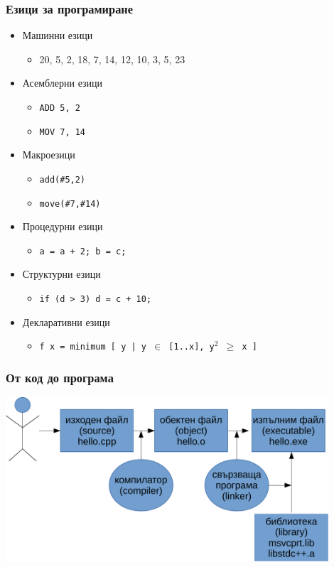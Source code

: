 \documentclass[alsotrans]{beamerswitch}
\begin{document}
\begin{frame}
  \frametitle{Езици за програмиране}
  \begin{itemize}[<+->]
  \item Машинни езици
    \begin{itemize}
    \item 20, 5, 2, 18, 7, 14, 12, 10, 3, 5, 23
    \end{itemize}
  \item Асемблерни езици
    \begin{itemize}
    \item \tt{ADD 5, 2}
    \item \tt{MOV 7, 14}
    \end{itemize}
  \item Макроезици
    \begin{itemize}
    \item \tt{add(\#5,2)}
    \item \tt{move(\#7,\#14)}
    \end{itemize}
  \item Процедурни езици
    \begin{itemize}
    \item \tt{a = a + 2; b = c;}
    \end{itemize}
  \item Структурни езици
    \begin{itemize}
    \item \tt{if (d > 3) d = c + 10;}
    \end{itemize}
  \item Декларативни езици
    \begin{itemize}
    \item \tt{f x = minimum [ y | y $\in$ [1..x], y${^2}$ $\geq$ x ]}
    \end{itemize}
  \end{itemize}
\end{frame}

\begin{frame}
  \frametitle{От код до програма}
  \includegraphics[width=0.9\textwidth]{images/compile.pdf}
\end{frame}
\end{document}
